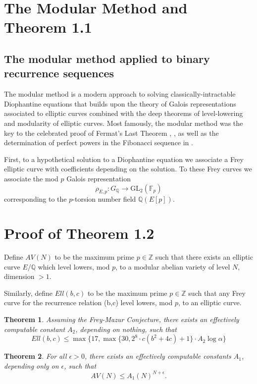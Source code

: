 \documentclass[12pt]{amsart}
\newtheorem{thm}{Theorem}[section]
\theoremstyle{definition}
\def\F{{\mathbb F}}
\def\Q{{\mathbb Q}}
\def\Z{{\mathbb Z}}
\newcommand{\GL}{\text{GL}}
\begin{document}
\section{The Modular Method and Theorem 1.1}

\subsection{The modular method applied to binary recurrence sequences}

The modular method is a modern approach to solving classically-intractable Diophantine equations that builds upon the theory of Galois representations associated to elliptic curves combined with the deep theorems of level-lowering and modularity of elliptic curves.  Most famously, the modular method was the key to the celebrated proof of Fermat's Last Theorem \cite{wiles95}, \cite{taylorwiles95}, as well as the determination of perfect powers in the Fibonacci sequence in \cite{siksek06}.

First, to a hypothetical solution to a Diophantine equation we associate a Frey elliptic curve with coefficients depending on the solution.  To these Frey curves we associate the mod $p$ Galois representation
\[ \rho_{E,p}: G_{\Q} \rightarrow \GL_2(\F_p) \]
corresponding to the $p$-torsion number field $\Q(E[p])$.



\section{Proof of Theorem 1.2}

Define $AV(N)$ to be the maximum prime $p \in \Z$ such that there exists an elliptic curve $E/\Q$ which level lowers, mod $p$, to a modular abelian variety of level $N$, dimension $> 1$. 

Similarly, define $Ell(b,c)$ to be the maximum prime $p \in \Z$ such that any Frey curve for the recurrence relation (b,c) level lowers, mod $p$, to an elliptic curve.

\begin{thm}\label{bound_ell}
Assuming the Frey-Mazur Conjecture, there exists an effectively computable constant $A_2$, depending on nothing, such that
\[Ell(b,c) \leq \max\{17, \max\{30, 2^{8} \cdot c(b^2+4c)+1\} \cdot A_2\log{\alpha} \} \]
\end{thm}
\begin{thm}\label{bound_av}
For all $\epsilon > 0$, there exists an effectively computable constants $A_1$, depending only on $\epsilon$, such that
\[AV(N) \leq A_1 \left( N \right)^{N + \epsilon}. \]
\end{thm}
\end{document}

